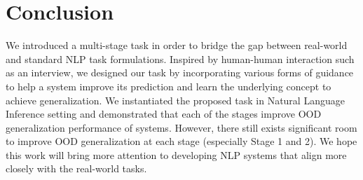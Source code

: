 \documentclass[11pt,a4paper]{article}
\newcommand{\taclpaper}{final version\xspace}
\newcommand{\taclpaper}{submission\xspace}
\begin{document}
\section{Conclusion}
We introduced a multi-stage task in order to bridge the gap between real-world and standard NLP task formulations. 
Inspired by human-human interaction such as an interview,
we designed our task by incorporating various forms of guidance to help a system improve its prediction and learn the underlying concept to achieve generalization.
We instantiated the proposed task in Natural Language Inference setting and demonstrated that each of the stages improve OOD generalization performance of systems.
However, there still exists significant room to improve OOD generalization at each stage (especially Stage 1 and 2). 
We hope this work will bring more attention to developing NLP systems that align more closely with the real-world tasks.


\end{document}
